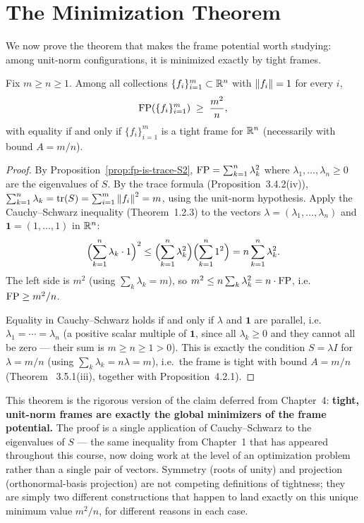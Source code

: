 \section{The Minimization Theorem}
\label{sec:fp-minimization}

We now prove the theorem that makes the frame potential worth studying:
among unit-norm configurations, it is minimized exactly by tight frames.

\begin{theorem}
\label{thm:fp-minimization}
Fix $m\ge n\ge1$. Among all collections $\{f_i\}_{i=1}^m\subset\mathbb{R}^n$
with $\left\| f_i \right\|=1$ for every $i$,
\[
  \operatorname{FP}(\{f_i\}_{i=1}^m) \;\ge\; \frac{m^2}{n},
\]
with equality if and only if $\{f_i\}_{i=1}^m$ is a tight frame for
$\mathbb{R}^n$ (necessarily with bound $A=m/n$).
\end{theorem}

\begin{proof}
By Proposition~\ref{prop:fp-is-trace-S2}, $\operatorname{FP}=\sum_{k=1}^n\lambda_k^2$
where $\lambda_1,\ldots,\lambda_n\ge0$ are the eigenvalues of $S$. By the
trace formula (Proposition~3.4.2(iv)), $\sum_{k=1}^n\lambda_k=\operatorname{tr}(S)=
\sum_{i=1}^m\left\| f_i \right\|^2=m$, using the unit-norm hypothesis. Apply the
Cauchy--Schwarz inequality (Theorem~1.2.3) to the vectors
$\lambda=(\lambda_1,\ldots,\lambda_n)$ and $\mathbf{1}=(1,\ldots,1)$ in
$\mathbb{R}^n$:
\[
  \Bigl(\sum_{k=1}^n\lambda_k\cdot1\Bigr)^2 \le
  \Bigl(\sum_{k=1}^n\lambda_k^2\Bigr)\Bigl(\sum_{k=1}^n1^2\Bigr)
  = n\sum_{k=1}^n\lambda_k^2.
\]
The left side is $m^2$ (using $\sum_k\lambda_k=m$), so
$m^2\le n\sum_k\lambda_k^2=n\cdot\operatorname{FP}$, i.e.\ $\operatorname{FP}\ge m^2/n$.

Equality in Cauchy--Schwarz holds if and only if $\lambda$ and
$\mathbf1$ are parallel, i.e.\ $\lambda_1=\cdots=\lambda_n$ (a positive
scalar multiple of $\mathbf 1$, since all $\lambda_k\ge0$ and they
cannot all be zero --- their sum is $m\ge n\ge1>0$). This is exactly the
condition $S=\lambda I$ for $\lambda=m/n$ (using $\sum_k\lambda_k=
n\lambda=m$), i.e.\ the frame is tight with bound $A=m/n$ (Theorem~
3.5.1(iii), together with Proposition~4.2.1).
\end{proof}

\begin{keyidea}
This theorem is the rigorous version of the claim deferred from
Chapter~4: \textbf{tight, unit-norm frames are exactly the global
minimizers of the frame potential.} The proof is a single application
of Cauchy--Schwarz to the eigenvalues of $S$ --- the same inequality
from Chapter~1 that has appeared throughout this course, now doing work
at the level of an optimization problem rather than a single pair of
vectors. Symmetry (roots of unity) and projection (orthonormal-basis
projection) are not competing definitions of tightness; they are simply
two different constructions that happen to land exactly on this unique
minimum value $m^2/n$, for different reasons in each case.
\end{keyidea}

